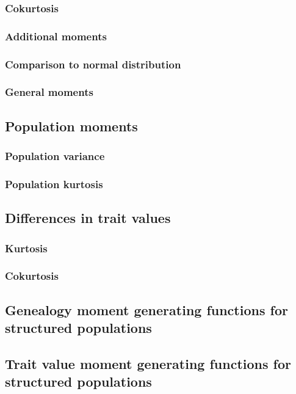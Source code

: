 \documentclass{article}
\begin{document}
\subsubsection{Cokurtosis}

\subsubsection{Additional moments}

\subsubsection{Comparison to normal distribution}

\subsubsection{General moments}

\subsection{Population moments}

\subsubsection{Population variance}

\subsubsection{Population kurtosis}

\subsection{Differences in trait values}
\subsubsection{Kurtosis}

\subsubsection{Cokurtosis}

\subsection{Genealogy moment generating functions for structured populations}

\subsection{Trait value moment generating functions for structured populations}

\end{document}
